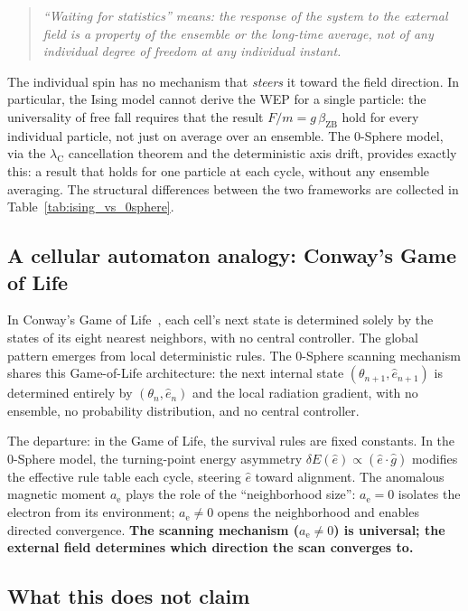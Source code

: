 \documentclass[%
 reprint, amsmath,amssymb, aps, prb, ]{revtex4-2}
\numberwithin{equation}{section}
\newcommand{\iphase}{\theta}
\newcommand{\lambdaC}{\lambda_{\mathrm{C}}}
\newcommand{\betaZB}{\beta_{\mathrm{ZB}}}
\newcommand{\anom}{a_{\mathrm{e}}}
\begin{document}
\begin{quote}
\textit{``Waiting for statistics'' means: the response of the system to the external field is a property of the ensemble or the long-time average, not of any individual degree of freedom at any individual instant.}
\end{quote}

The individual spin has no mechanism that \emph{steers} it toward the field direction. In particular, the Ising model cannot derive the WEP for a single particle: the universality of free fall requires that the result $F/m = g\,\betaZB$ hold for every individual particle, not just on average over an ensemble. The 0-Sphere model, via the $\lambdaC$ cancellation theorem and the deterministic axis drift, provides exactly this: a result that holds for one particle at each cycle, without any ensemble averaging.
The structural differences between the two frameworks are collected in Table~\ref{tab:ising_vs_0sphere}.

\subsection{A cellular automaton analogy: Conway's Game of Life}
\label{subsec:gol}

In Conway's Game of Life~\cite{gardner1970}, each cell's next state is determined solely by the states of its eight nearest neighbors, with no central controller. The global pattern emerges from local deterministic rules. The 0-Sphere scanning mechanism shares this Game-of-Life architecture: the next internal state $(\iphase_{n+1}, \hat{e}_{n+1})$ is determined entirely by $(\iphase_n, \hat{e}_n)$ and the local radiation gradient, with no ensemble, no probability distribution, and no central controller.

The departure: in the Game of Life, the survival rules are fixed constants. In the 0-Sphere model, the turning-point energy asymmetry $\delta E(\hat{e}) \propto (\hat{e}\cdot\hat{g})$ modifies the effective rule table each cycle, steering $\hat{e}$ toward alignment. The anomalous magnetic moment $\anom$ plays the role of the ``neighborhood size'': $\anom = 0$ isolates the electron from its environment; $\anom \neq 0$ opens the neighborhood and enables directed convergence. \textbf{The scanning mechanism ($\anom \neq 0$) is universal; the external field determines which direction the scan converges to.}

\subsection{What this does not claim}
\end{document}
